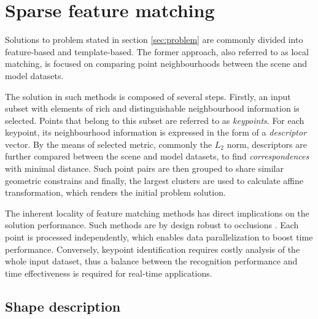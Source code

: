
\chapter{Sparse feature matching}
\label{cha:feature}

Solutions to problem stated in section \ref{sec:problem} are commonly divided \cite{something} into feature-based and template-based. The former approach, also referred to as local matching, is focused on comparing point neighbourhoods between the scene and model datasets. 

The solution in such methods is composed of several steps. Firstly, an input subset with elements of rich and distinguishable neighbourhood information is selected. Points that belong to this subset are referred to as \textit{keypoints}. For each keypoint, its neighbourhood information is expressed in the form of a \textit{descriptor} vector. By the means of selected metric, commonly the $L_2$ norm, descriptors are further compared between the scene and model datasets, to find \textit{correspondences} with minimal distance. Such point pairs are then grouped to share similar geometric constrains and finally, the largest clusters are used to calculate affine transformation, which renders the initial problem solution.

The inherent locality of feature matching methods has direct implications on the solution performance. Such methods are by design robust to occlusions \cite{something}. Each point is processed independently, which enables data parallelization to boost time performance. Conversely, keypoint identification requires costly analysis of the whole input dataset, thus a balance between the recognition performance and time effectiveness is required \cite{somethin} for real-time applications.


\section{Shape description} %
\label{sec:shape} %

